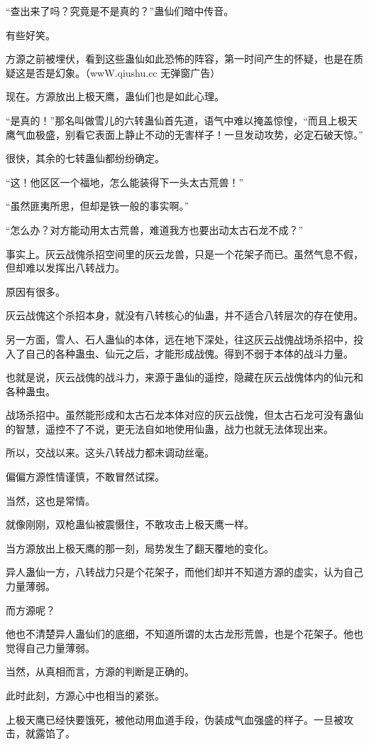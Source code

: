 \begin{this_body}
“查出来了吗？究竟是不是真的？”蛊仙们暗中传音。

有些好笑。

方源之前被埋伏，看到这些蛊仙如此恐怖的阵容，第一时间产生的怀疑，也是在质疑这是否是幻象。（wwW.qiushu.cc 无弹窗广告）

现在。方源放出上极天鹰，蛊仙们也是如此心理。

“是真的！”那名叫做雪儿的六转蛊仙首先道，语气中难以掩盖惊惶，“而且上极天鹰气血极盛，别看它表面上静止不动的无害样子！一旦发动攻势，必定石破天惊。”

很快，其余的七转蛊仙都纷纷确定。

“这！他区区一个福地，怎么能装得下一头太古荒兽！”

“虽然匪夷所思，但却是铁一般的事实啊。”

“怎么办？对方能动用太古荒兽，难道我方也要出动太古石龙不成？”

事实上。灰云战傀杀招空间里的灰云龙兽，只是一个花架子而已。虽然气息不假，但却难以发挥出八转战力。

原因有很多。

灰云战傀这个杀招本身，就没有八转核心的仙蛊，并不适合八转层次的存在使用。

另一方面，雪人、石人蛊仙的本体，远在地下深处，往这灰云战傀战场杀招中，投入了自己的各种蛊虫、仙元之后，才能形成战傀。得到不弱于本体的战斗力量。

也就是说，灰云战傀的战斗力，来源于蛊仙的遥控，隐藏在灰云战傀体内的仙元和各种蛊虫。

战场杀招中。虽然能形成和太古石龙本体对应的灰云战傀，但太古石龙可没有蛊仙的智慧，遥控不了不说，更无法自如地使用仙蛊，战力也就无法体现出来。

所以，交战以来。这头八转战力都未调动丝毫。

偏偏方源性情谨慎，不敢冒然试探。

当然，这也是常情。

就像刚刚，双枪蛊仙被震慑住，不敢攻击上极天鹰一样。

当方源放出上极天鹰的那一刻，局势发生了翻天覆地的变化。

异人蛊仙一方，八转战力只是个花架子，而他们却并不知道方源的虚实，认为自己力量薄弱。

而方源呢？

他也不清楚异人蛊仙们的底细，不知道所谓的太古龙形荒兽，也是个花架子。他也觉得自己力量薄弱。

当然，从真相而言，方源的判断是正确的。

此时此刻，方源心中也相当的紧张。

上极天鹰已经快要饿死，被他动用血道手段，伪装成气血强盛的样子。一旦被攻击，就露馅了。


\end{this_body}
